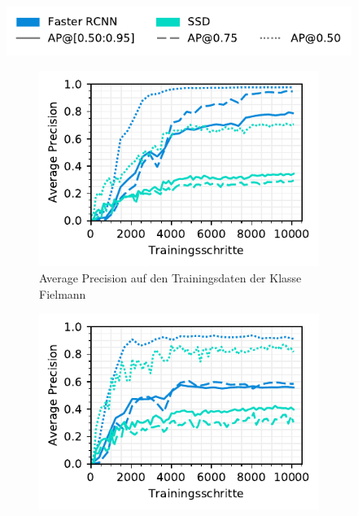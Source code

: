 \begin{figure}[h!] 
  \captionsetup{width=.9\linewidth}
  \caption{Average Precision auf den Trainings- und Testdaten der Leistungserbringer spezifischen Modelle}
  \label{fig:specific-ie}
  \centering
  \includegraphics[scale=1]{graphics/matplot/img-detection__legend_3.pdf}
  \begin{subfigure}[b]{0.5\linewidth}
    \captionsetup{width=.9\linewidth}
    \centering
    \includegraphics[scale=1]{graphics/matplot/img-detection__fielmann__ap__train.pdf}
    \caption{Average Precision auf den Trainingsdaten der Klasse Fielmann} 
    \label{fig:specific-ie:fielmann:ap_train}
    \vspace{2ex}
  \end{subfigure}%
  \begin{subfigure}[b]{0.5\linewidth}
    \captionsetup{width=.9\linewidth}
    \centering
    \includegraphics[scale=1]{graphics/matplot/img-detection__visilab__ap.pdf}

\end{subfigure}
\end{figure}
